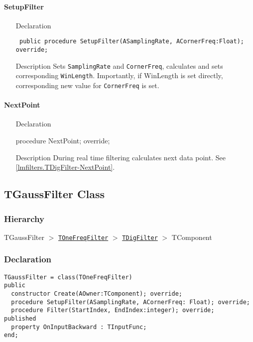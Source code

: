 \documentclass[12pt,a4paper,oneside]{report}
\newcommand{\declarationitem}[1]{{\addfontfeatures{FakeSlant} #1}}
\newcommand{\descriptiontitle}[1]{{\addfontfeatures{FakeSlant}#1}}
\newcommand{\code}[1]{\texttt{#1}}
\begin{document}
\paragraph{SetupFilter}\hspace*{\fill}
\label{lmfilters.TMovAvFilter-SetupFilter}
\begin{itemize}\item[\declarationitem{Declaration}\hfill]
	\begin{flushleft}
		\code{
			public procedure SetupFilter(ASamplingRate, ACornerFreq:Float); override;}
	\end{flushleft}
\item[\descriptiontitle{Description}] Sets \code{SamplingRate} and \code{CornerFreq}, calculates and sets corresponding \code{WinLength}. Importantly, if WinLength is set directly, corresponding new value for \code{CornerFreq} is set. 
\end{itemize}
\paragraph{NextPoint}\hspace*{\fill}
\begin{itemize}
	\item[\declarationitem{Declaration}\hfill]
	\begin{flushleft}
	procedure NextPoint; override;	
	\end{flushleft}
	\item[\descriptiontitle{Description}] During real time filtering calculates next data point. See \ref{lmfilters.TDigFilter-NextPoint}.
\end{itemize}	
\subsection{TGaussFilter Class}
\label{lmfilters.TGaussFilter}
\subsubsection{Hierarchy}
TGaussFilter {$>$} \hyperref[lmfilters.TOneFreqFilter]{\code{TOneFreqFilter}} {$>$} \hyperref[lmfilters.TDigFilter]{\code{TDigFilter}} {$>$} TComponent
\subsubsection{Declaration}
\begin{verbatim}
TGaussFilter = class(TOneFreqFilter)
public
  constructor Create(AOwner:TComponent); override;
  procedure SetupFilter(ASamplingRate, ACornerFreq: Float); override;
  procedure Filter(StartIndex, EndIndex:integer); override;
published
  property OnInputBackward : TInputFunc;
end;
\end{verbatim}
\end{document}
